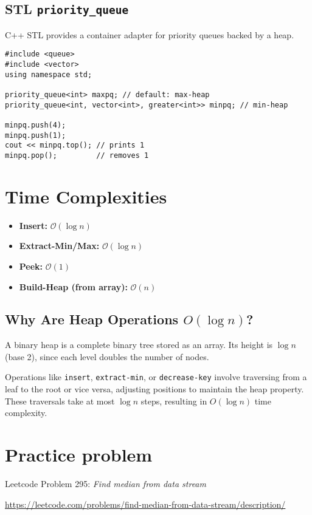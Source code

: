 \documentclass{article}
\begin{document}
\subsection{STL \texttt{priority\_queue}}

C++ STL provides a container adapter for priority queues backed by a heap.

\begin{lstlisting}[style=cppstyle]
#include <queue>
#include <vector>
using namespace std;

priority_queue<int> maxpq; // default: max-heap
priority_queue<int, vector<int>, greater<int>> minpq; // min-heap

minpq.push(4);
minpq.push(1);
cout << minpq.top(); // prints 1
minpq.pop();         // removes 1
\end{lstlisting}

\section{Time Complexities}
\begin{itemize}
  \item \textbf{Insert:} $\mathcal{O}(\log n)$
  \item \textbf{Extract-Min/Max:} $\mathcal{O}(\log n)$
  \item \textbf{Peek:} $\mathcal{O}(1)$
  \item \textbf{Build-Heap (from array):} $\mathcal{O}(n)$
\end{itemize}

\subsection*{Why Are Heap Operations $O(\log n)$?}

A binary heap is a complete binary tree stored as an array. Its height is $\log n$ (base 2), since each level doubles the number of nodes.

Operations like \texttt{insert}, \texttt{extract-min}, or \texttt{decrease-key} involve traversing from a leaf to the root or vice versa, adjusting positions to maintain the heap property. These traversals take at most $\log n$ steps, resulting in $O(\log n)$ time complexity.

\section{Practice problem}
Leetcode Problem 295: \textit{Find median from data stream}

\url{https://leetcode.com/problems/find-median-from-data-stream/description/}
\end{document}
